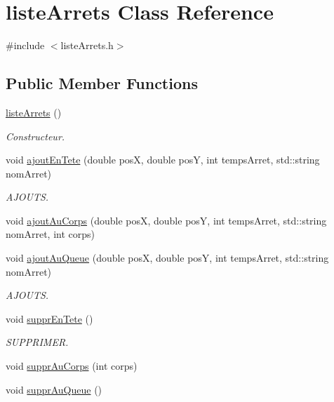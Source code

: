 \hypertarget{classliste_arrets}{}\section{liste\+Arrets Class Reference}
\label{classliste_arrets}


{\ttfamily \#include $<$liste\+Arrets.\+h$>$}

\subsection*{Public Member Functions}
\begin{DoxyCompactItemize}
\item 
\hyperlink{classliste_arrets_abbfaa5d64a48879f0786338279371b83}{liste\+Arrets} ()
\begin{DoxyCompactList}\small\item\em Constructeur. \end{DoxyCompactList}\item 
void \hyperlink{classliste_arrets_a7168c4b4ca72f6ab07f02d4af5877586}{ajout\+En\+Tete} (double posX, double posY, int temps\+Arret, std\+::string nom\+Arret)
\begin{DoxyCompactList}\small\item\em A\+J\+O\+U\+TS. \end{DoxyCompactList}\item 
void \hyperlink{classliste_arrets_adbe0e8547d19edc9bf0982296fab2dfe}{ajout\+Au\+Corps} (double posX, double posY, int temps\+Arret, std\+::string nom\+Arret, int corps)
\item 
void \hyperlink{classliste_arrets_ad9ed677ee4b46f66fdfaba2386dd76c0}{ajout\+Au\+Queue} (double posX, double posY, int temps\+Arret, std\+::string nom\+Arret)
\begin{DoxyCompactList}\small\item\em A\+J\+O\+U\+TS. \end{DoxyCompactList}\item 
void \hyperlink{classliste_arrets_a20fce6e1d98821ff429d7f7f3c9884d3}{suppr\+En\+Tete} ()
\begin{DoxyCompactList}\small\item\em S\+U\+P\+P\+R\+I\+M\+ER. \end{DoxyCompactList}\item 
void \hyperlink{classliste_arrets_a41a1078cbefd801be82a355bd3aa7a75}{suppr\+Au\+Corps} (int corps)
\item 
void \hyperlink{classliste_arrets_a2321a82dd320d42c1a448035e0bd80e9}{suppr\+Au\+Queue} ()

\end{DoxyCompactItemize}
